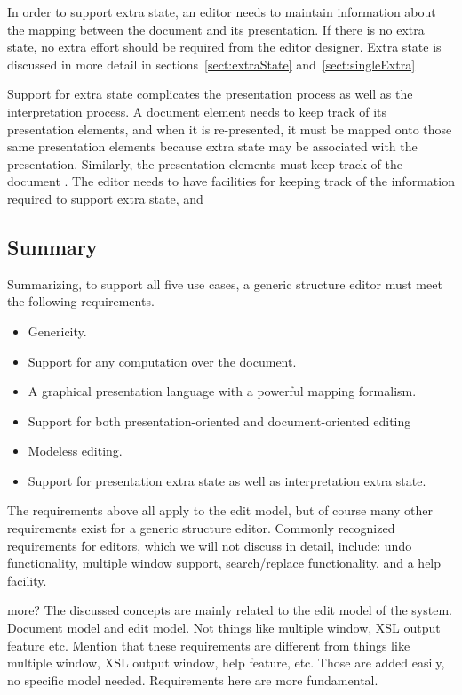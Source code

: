 \documentclass{speauth}
\begin{document}
In order to support extra state, an editor needs to maintain information about the mapping between the document and its presentation. If there is no extra state, no extra effort should be required from the editor designer. Extra state is discussed in more detail in sections~\ref{sect:extraState} and~\ref{sect:singleExtra}

\bc
Support for extra state complicates the presentation process as well as the interpretation process. A document element needs to keep track of its presentation elements, and when it is re-presented, it must be mapped onto those same presentation elements because extra state may be associated with the presentation. Similarly, the presentation elements must keep track of the document . The editor needs to have facilities for keeping track of the information required to support extra state, and
\ec


%																
\subsection{Summary}

Summarizing, to support all five use cases, a generic structure editor must meet the following requirements.

\begin{itemize}
\item Genericity.
\item Support for any computation over the document.
\item A graphical presentation language with a powerful mapping formalism.
\item Support for both presentation-oriented and document-oriented editing %
\item Modeless editing.
\item Support for presentation extra state as well as interpretation extra state.
\end{itemize}

The requirements above all apply to the edit model, but of course many other requirements exist for a generic structure editor.  Commonly recognized requirements for editors, which we will not discuss in detail, include: undo functionality, multiple window support, search/replace functionality, and a help facility. 

\bc
more?
The discussed concepts are mainly related to the edit model of the system. 
Document model and edit model. Not things like multiple window, XSL output feature etc.
Mention that these requirements are different from things like multiple window, XSL output window, help feature, etc. Those are added easily, no specific model needed. Requirements here are more fundamental.
\end{document}
